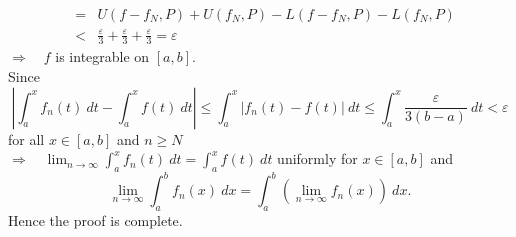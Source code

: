 \documentclass[12pt]{book}
\begin{document}
\begin{CJK}{UTF8}{bsmi}
\begin{eqnarray*}
    & = & U(f-f_N, P)+U(f_N, P)-L(f-f_N, P)-L(f_N, P) \\
    & < & \frac{\varepsilon}{3} + \frac{\varepsilon}{3} + \frac{\varepsilon}{3} = \varepsilon
\end{eqnarray*}
$\Rightarrow\quad f$ is integrable on $\left[ a, b \right]$. \\
Since 
\[
\left|
\int_a^x f_n(t)\ dt - \int_a^x f(t)\ dt
\right|
\le \int_a^x \left| f_n(t) - f(t) \right|\ dt
\le \int_a^x \frac{\varepsilon}{3(b-a)}\ dt
<\varepsilon
\]
for all $x\in\left[ a, b \right]$ and $n\ge N$ \\
$\Rightarrow\quad\lim_{n\rightarrow\infty}\int_a^x f_n(t)\ dt=\int_a^x f(t)\ dt$ uniformly for $x\in\left[ a, b \right]$ and
\[
\lim_{n\rightarrow\infty}\int_a^b f_n(x)\ dx
=\int_a^b\left( \lim_{n\rightarrow\infty}f_n(x) \right)\ dx.
\]
Hence the proof is complete. \\


\end{CJK}
\end{document}
